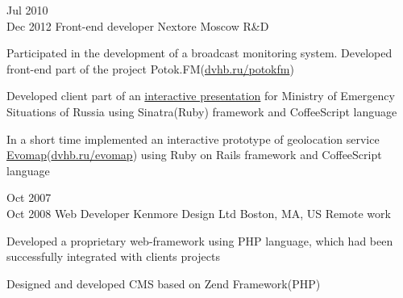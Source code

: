 \documentclass[11pt,a4paper,sans]{moderncv}
\newcommand{\lang}[2]{#2}
\begin{document}
\cventry
    {\lang{Июл}{Jul} 2010\\\lang{Дек}{Dec} 2012}
    {\lang
        {Фронтенд разработчик}
        {Front-end developer}}
    {Nextore}
    {\lang
        {Москва}
        {Moscow}}
    {}
    {\lang
        {Разработка проектов компании}
        {R\&D}}

\cvlistitem
    {\lang
        {Принимал участие в проектировании системы мониторинга радиоэфира «Поток.FM»(\href{https://dvhb.ru/potokfm/}{dvhb.ru/potokfm}), занимался разработкой клиентской части сервиса. Использованные технологии: JavaScript(Prototype.js), Ruby(Sinatra), CSS.}
        {Participated in the development of a broadcast monitoring system. Developed front-end part of the project {\textquotedbl}Potok.FM{\textquotedbl}(\href{https://dvhb.ru/potokfm}{dvhb.ru/potokfm})}}

\cvlistitem
    {\lang
        {Разработал клиентскую часть интерактивной презентации для \href{http://nextore.ru/projects/3}{МЧС России}. Использованные технологии: Ruby(Sinatra), HAML, SCSS(Compass), CoffeeScript}
        {Developed client part of an \href{http://nextore.ru/projects/3}{interactive presentation} for Ministry of Emergency Situations of Russia using Sinatra(Ruby) framework and CoffeeScript language}}

\cvlistitem
    {\lang
        {В сжатые сроки реализовал прототип сервиса «\href{https://dvhb.ru/evomap}{Эвомап}» с использованием Ruby on Rails, CoffeeScript, Backbone и SCSS}
        {In a short time implemented an interactive prototype of geolocation service {\textquotedbl}\href{https://dvhb.ru/evomap}{Evomap}(\href{https://dvhb.ru/evomap}{dvhb.ru/evomap}){\textquotedbl} using Ruby on Rails framework and CoffeeScript language}\\}



\cventry
    {\lang{Окт}{Oct} 2007\\\lang{Окт}{Oct} 2008}
    {\lang
        {Программист}
        {Web Developer}}
    {Kenmore Design Ltd}
    {\lang
        {Бостон, Массачусетс, США}
        {Boston, MA, US}}
    {\lang
        {удалённая работа}
        {Remote work}}
    {}

\cvlistitem
    {\lang
        {Разработал веб-фреймворк для создания сайтов на языке PHP, который был успешно использован при создании проектов клиентов компании.}
        {Developed a proprietary web-framework using PHP language, which had been successfully integrated with clients projects}}

\cvlistitem
    {\lang
        {Разработал CMS на основе Zend Framework(PHP).}
        {Designed and developed CMS based on Zend Framework(PHP)}\\}
\end{document}
